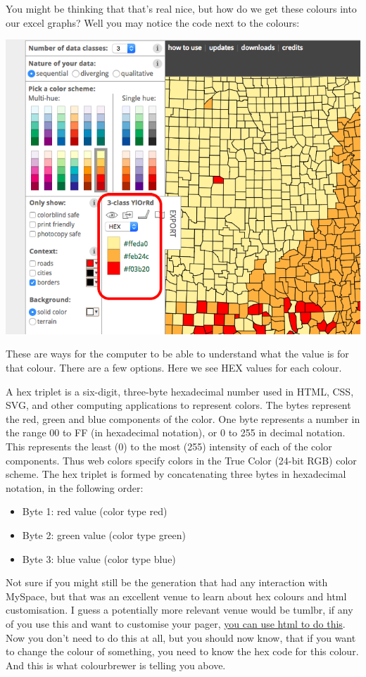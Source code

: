 \documentclass[]{book}
\providecommand{\tightlist}{%
  \setlength{\itemsep}{0pt}\setlength{\parskip}{0pt}}
\theoremstyle{definition}
\theoremstyle{definition}
\theoremstyle{definition}
\theoremstyle{remark}
\begin{document}
You might be thinking that that's real nice, but how do we get these
colours into our excel graphs? Well you may notice the code next to the
colours:

\includegraphics{imgs/how_to_copy_cols.png}

These are ways for the computer to be able to understand what the value
is for that colour. There are a few options. Here we see HEX values for
each colour.

A hex triplet is a six-digit, three-byte hexadecimal number used in
HTML, CSS, SVG, and other computing applications to represent colors.
The bytes represent the red, green and blue components of the color. One
byte represents a number in the range 00 to FF (in hexadecimal
notation), or 0 to 255 in decimal notation. This represents the least
(0) to the most (255) intensity of each of the color components. Thus
web colors specify colors in the True Color (24-bit RGB) color scheme.
The hex triplet is formed by concatenating three bytes in hexadecimal
notation, in the following order:

\begin{itemize}
\tightlist
\item
  Byte 1: red value (color type red)
\item
  Byte 2: green value (color type green)
\item
  Byte 3: blue value (color type blue)
\end{itemize}

Not sure if you might still be the generation that had any interaction
with MySpace, but that was an excellent venue to learn about hex colours
and html customisation. I guess a potentially more relevant venue would
be tumlbr, if any of you use this and want to customise your pager,
\href{https://www.tumblr.com/docs/en/custom_themes}{you can use html to
do this}. Now you don't need to do this at all, but you should now know,
that if you want to change the colour of something, you need to know the
hex code for this colour. And this is what colourbrewer is telling you
above.
\end{document}

